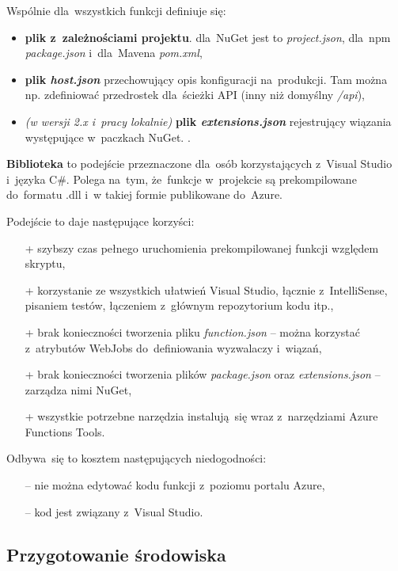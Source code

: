 \documentclass[12pt,a4paper,twoside,titlepage,openright]{book}
\begin{document}
Wspólnie dla~wszystkich funkcji definiuje się:
\begin{itemize}
\item \textbf{plik z~zależnościami projektu}. dla~NuGet jest to \textit{project.json}, dla~npm \textit{package.json} i~dla~Mavena \textit{pom.xml},
\item \textbf{plik \textit{host.json}} przechowujący opis konfiguracji na~produkcji. Tam można np. zdefiniować przedrostek dla~ścieżki API (inny niż domyślny \textit{/api}),
\item \textit{(w wersji 2.x i~pracy lokalnie)} \textbf{plik \textit{extensions.json}} rejestrujący wiązania występujące w~paczkach NuGet. \cite{siteAppCSharpScript}.
\end{itemize}

\textbf{Biblioteka} to podejście przeznaczone dla~osób korzystających z~Visual Studio i~języka C\#. Polega na~tym, że~funkcje w~projekcie są prekompilowane do~formatu .dll i~w takiej formie publikowane do~Azure. 

Podejście to daje następujące korzyści: \cite{siteAppLibrary}
\begin{itemize}
\item[+] szybszy czas pełnego uruchomienia prekompilowanej funkcji względem skryptu,
\item[+] korzystanie ze wszystkich ułatwień Visual Studio, łącznie z~IntelliSense, pisaniem testów, łączeniem z~głównym repozytorium kodu itp.,
\item[+] brak konieczności tworzenia pliku \textit{function.json} -- można korzystać z~atrybutów WebJobs do~definiowania wyzwalaczy i~wiązań,
\item[+] brak konieczności tworzenia plików \textit{package.json} oraz \textit{extensions.json} -- zarządza nimi NuGet,
\item[+] wszystkie potrzebne narzędzia instalują~się wraz z~narzędziami Azure Functions Tools.
\end{itemize}
Odbywa~się to kosztem następujących niedogodności:
\begin{itemize}
\item[--] nie można edytować kodu funkcji z~poziomu portalu Azure,
\item[--] kod jest związany z~Visual Studio.
\end{itemize}


\subsection{Przygotowanie środowiska}
\end{document}

